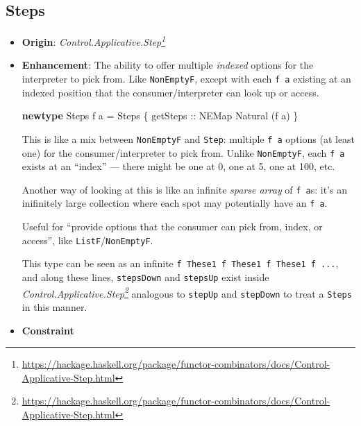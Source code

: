 \documentclass[]{article}
\newenvironment{Shaded}{}{}
\newcommand{\DataTypeTok}[1]{\textcolor[rgb]{0.56,0.13,0.00}{#1}}
\newcommand{\KeywordTok}[1]{\textcolor[rgb]{0.00,0.44,0.13}{\textbf{#1}}}
\newcommand{\NormalTok}[1]{#1}
\newcommand{\OtherTok}[1]{\textcolor[rgb]{0.00,0.44,0.13}{#1}}
\renewcommand{\href}[2]{#2\footnote{\url{#1}}}
\begin{document}
\hypertarget{steps}{%
\subsection{Steps}\label{steps}}

\begin{itemize}
\item
  \textbf{Origin}:
  \emph{\href{https://hackage.haskell.org/package/functor-combinators/docs/Control-Applicative-Step.html}{Control.Applicative.Step}}
\item
  \textbf{Enhancement}: The ability to offer multiple \emph{indexed} options for
  the interpreter to pick from. Like \texttt{NonEmptyF}, except with each
  \texttt{f\ a} existing at an indexed position that the consumer/interpreter
  can look up or access.

\begin{Shaded}
\begin{Highlighting}[]
\KeywordTok{newtype} \DataTypeTok{Steps}\NormalTok{ f a }\OtherTok{=} \DataTypeTok{Steps}\NormalTok{ \{}\OtherTok{ getSteps ::} \DataTypeTok{NEMap} \DataTypeTok{Natural}\NormalTok{ (f a) \}}
\end{Highlighting}
\end{Shaded}

  This is like a mix between \texttt{NonEmptyF} and \texttt{Step}: multiple
  \texttt{f\ a} options (at least one) for the consumer/interpreter to pick
  from. Unlike \texttt{NonEmptyF}, each \texttt{f\ a} exists at an ``index'' ---
  there might be one at 0, one at 5, one at 100, etc.

  Another way of looking at this is like an infinite \emph{sparse array} of
  \texttt{f\ a}s: it's an inifinitely large collection where each spot may
  potentially have an \texttt{f\ a}.

  Useful for ``provide options that the consumer can pick from, index, or
  access'', like \texttt{ListF}/\texttt{NonEmptyF}.

  This type can be seen as an infinite
  \texttt{f\ \textasciigrave{}These1\textasciigrave{}\ f\ \textasciigrave{}These1\textasciigrave{}\ f\ \textasciigrave{}These1\textasciigrave{}\ f\ ...},
  and along these lines, \texttt{stepsDown} and \texttt{stepsUp} exist inside
  \emph{\href{https://hackage.haskell.org/package/functor-combinators/docs/Control-Applicative-Step.html}{Control.Applicative.Step}}
  analogous to \texttt{stepUp} and \texttt{stepDown} to treat a \texttt{Steps}
  in this manner.
\item
  \textbf{Constraint}


\end{itemize}
\end{document}
